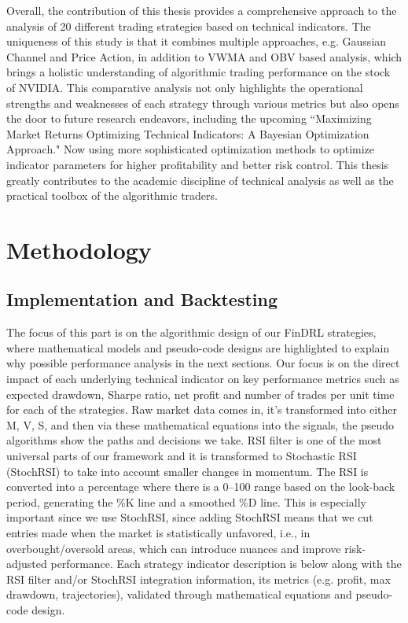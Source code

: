 Overall, the contribution of this thesis provides a comprehensive approach to the analysis of 20 different trading strategies based on technical indicators. The uniqueness of this study is that it combines multiple approaches, e.g. Gaussian Channel and Price Action, in addition to VWMA and OBV based analysis, which brings a holistic understanding of algorithmic trading performance on the stock of NVIDIA. This comparative analysis not only highlights the operational strengths and weaknesses of each strategy through various metrics but also opens the door to future research endeavors, including the upcoming “Maximizing Market Returns Optimizing Technical Indicators: A Bayesian Optimization Approach." Now using more sophisticated optimization methods to optimize indicator parameters for higher profitability and better risk control. This thesis greatly contributes to the academic discipline of technical analysis as well as the practical toolbox of the algorithmic traders.


\section{Methodology}
\subsection{Implementation and Backtesting}
The focus of this part is on the algorithmic design of our FinDRL strategies, where mathematical models and pseudo-code designs are highlighted to explain why possible performance analysis in the next sections. Our focus is on the direct impact of each underlying technical indicator on key performance metrics such as expected drawdown, Sharpe ratio, net profit and number of trades per unit time for each of the strategies. Raw market data comes in, it’s transformed into either M, V, S, and then via these mathematical equations into the signals, the pseudo algorithms show the paths and decisions we take.
RSI filter is one of the most universal parts of our framework and it is transformed to Stochastic RSI (StochRSI) to take into account smaller changes in momentum. The RSI is converted into a percentage where there is a 0–100 range based on the look-back period, generating the \%K line and a smoothed \%D line. This is especially important since we use StochRSI, since adding StochRSI means that we cut entries made when the market is statistically unfavored, i.e., in overbought/oversold areas, which can introduce nuances and improve risk-adjusted performance. Each strategy indicator description is below along with the RSI filter and/or StochRSI integration information, its metrics (e.g. profit, max drawdown, trajectories), validated through mathematical equations and pseudo-code design.


